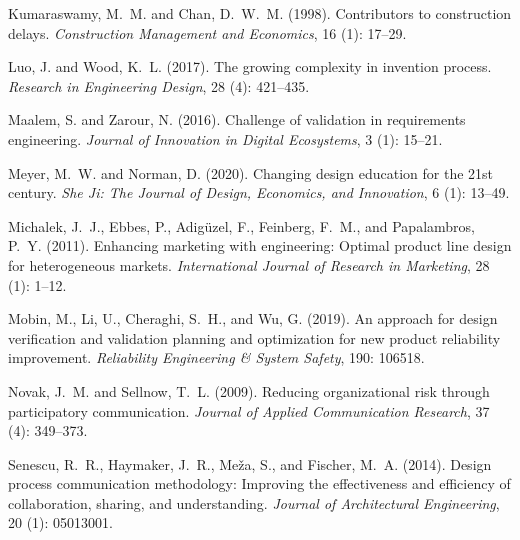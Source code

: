\documentclass{PDS}
\begin{document}
\begin{Backmatter}
\begin{thebibliography}{21}
     Kumaraswamy, M.~M. and Chan, D.~W.~M. (1998). \newblock Contributors to construction delays. \newblock \emph{Construction Management and Economics}, 16 (1): 17--29.
    
     Luo, J. and Wood, K.~L. (2017). \newblock The growing complexity in invention process. \newblock \emph{Research in Engineering Design}, 28 (4): 421--435.
    
     Maalem, S. and Zarour, N. (2016). \newblock Challenge of validation in requirements engineering. \newblock \emph{Journal of Innovation in Digital Ecosystems}, 3 (1): 15--21.
    
     Meyer, M.~W. and Norman, D. (2020). \newblock Changing design education for the 21st century. \newblock \emph{She Ji: The Journal of Design, Economics, and Innovation}, 6 (1): 13--49.
    
     Michalek, J.~J., Ebbes, P., Adigüzel, F., Feinberg, F.~M., and Papalambros, P.~Y. (2011). \newblock Enhancing marketing with engineering: Optimal product line design for heterogeneous markets. \newblock \emph{International Journal of Research in Marketing}, 28 (1): 1--12.
    
     Mobin, M., Li, U., Cheraghi, S.~H., and Wu, G. (2019). \newblock An approach for design verification and validation planning and optimization for new product reliability improvement. \newblock \emph{Reliability Engineering \& System Safety}, 190: 106518.
    
     Novak, J.~M. and Sellnow, T.~L. (2009). \newblock Reducing organizational risk through participatory communication. \newblock \emph{Journal of Applied Communication Research}, 37 (4): 349--373.
    
     Senescu, R.~R., Haymaker, J.~R., Meža, S., and Fischer, M.~A. (2014). \newblock Design process communication methodology: Improving the effectiveness and efficiency of collaboration, sharing, and understanding. \newblock \emph{Journal of Architectural Engineering}, 20 (1): 05013001.
    

\end{thebibliography}
\end{Backmatter}
\end{document}
